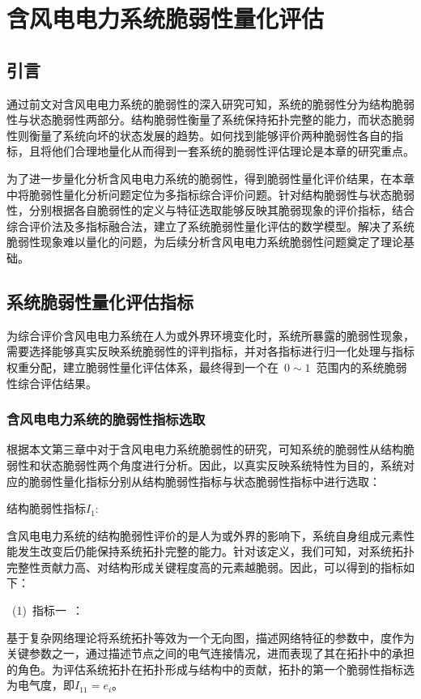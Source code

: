 \chapter{含风电电力系统脆弱性量化评估}
\label{cha:quanti}

\section{引言}
\label{sec:index4}
通过前文对含风电电力系统的脆弱性的深入研究可知，系统的脆弱性分为结构脆弱性与状态脆弱性两部分。结构脆弱性衡量了系统保持拓扑完整的能力，而状态脆弱性则衡量了系统向坏的状态发展的趋势。如何找到能够评价两种脆弱性各自的指标，且将他们合理地量化从而得到一套系统的脆弱性评估理论是本章的研究重点。

为了进一步量化分析含风电电力系统的脆弱性，得到脆弱性量化评价结果，在本章中将脆弱性量化分析问题定位为多指标综合评价问题。针对结构脆弱性与状态脆弱性，分别根据各自脆弱性的定义与特征选取能够反映其脆弱现象的评价指标，结合综合评价法及多指标融合法，建立了系统脆弱性量化评估的数学模型。解决了系统脆弱性现象难以量化的问题，为后续分析含风电电力系统脆弱性问题奠定了理论基础。

\section{系统脆弱性量化评估指标}
\label{sec:describIndex}
为综合评价含风电电力系统在人为或外界环境变化时，系统所暴露的脆弱性现象，需要选择能够真实反映系统脆弱性的评判指标，并对各指标进行归一化处理与指标权重分配，建立脆弱性量化评估体系，最终得到一个在~$0\sim1$~范围内的系统脆弱性综合评估结果。

\subsection{含风电电力系统的脆弱性指标选取}
\label{sec:pickIndex}
根据本文第三章中对于含风电电力系统脆弱性的研究，可知系统的脆弱性从结构脆弱性和状态脆弱性两个角度进行分析。因此，以真实反映系统特性为目的，系统对应的脆弱性量化指标分别从结构脆弱性指标与状态脆弱性指标中进行选取：

结构脆弱性指标$I_1$:

含风电电力系统的结构脆弱性评价的是人为或外界的影响下，系统自身组成元素性能发生改变后仍能保持系统拓扑完整的能力。针对该定义，我们可知，对系统拓扑完整性贡献力高、对结构形成关键程度高的元素越脆弱。因此，可以得到的指标如下：

~(1)~指标一~：

基于复杂网络理论将系统拓扑等效为一个无向图，描述网络特征的参数中，度作为关键参数之一，通过描述节点之间的电气连接情况，进而表现了其在拓扑中的承担的角色。为评估系统拓扑在拓扑形成与结构中的贡献，拓扑的第一个脆弱性指标选为电气度，即$I_{11}=e_i$。

